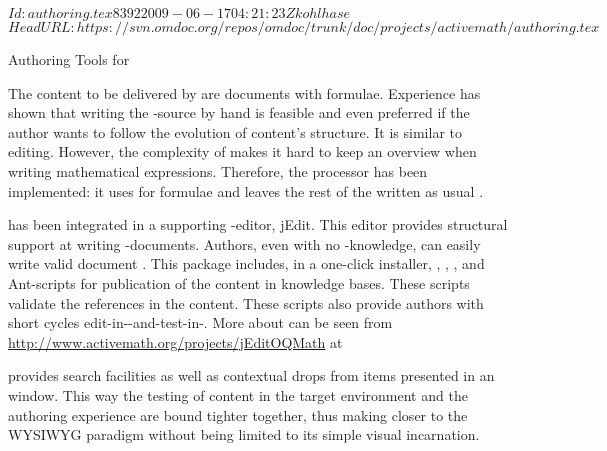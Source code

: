 \svnInfo $Id: authoring.tex 8392 2009-06-17 04:21:23Z kohlhase $
\svnKeyword $HeadURL: https://svn.omdoc.org/repos/omdoc/trunk/doc/projects/activemath/authoring.tex $

\begin{omgroup}[id=jeditoqmath,creators=libbrecht]{Authoring Tools for {\activemath}}


The {\omdoc} content to be delivered by {\activemath} are {\omdoc} documents with
{\openmath} formulae. Experience has shown that writing the {\xml}-source by hand is
feasible and even preferred if the author wants to follow the evolution of content's
structure.  It is similar to {\html} editing.  However, the complexity of {\xml} makes it
hard to keep an overview when writing mathematical expressions. Therefore, the
{} processor has been implemented: it uses {} for formulae and
leaves the rest of the {\omdoc} written as usual {\xml}.

{} has been integrated in a supporting {\xml}-editor, jEdit. This editor
provides structural support at writing {\xml}-documents. Authors, even with no
{\xml}-knowledge, can easily write valid document {}.  This package
includes, in a one-click installer, {\qmath}, {}, {}, and
Ant-scripts for publication of the content in {\activemath} knowledge bases.  These
scripts validate the references in the content.  These scripts also provide authors with
short cycles edit-in-{}-and-test-in-{\activemath}.  More about
{} can be seen from
{\url{http://www.activemath.org/projects/jEditOQMath}} at~\cite{AM-authoring-from-dev-on}


{} provides search facilities as well as contextual drops from items
presented in an {\activemath} window.  This way the testing of content in the target
environment and the authoring experience are bound tighter together,
thus making {} closer to the WYSIWYG paradigm without being limited to
its simple visual incarnation.


\end{omgroup}
